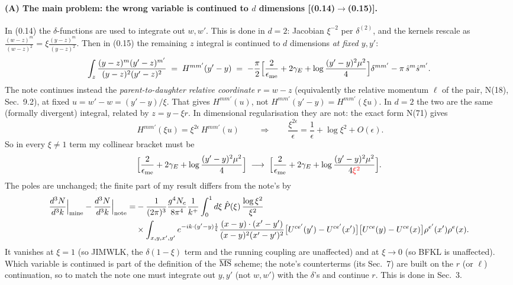 \documentclass[10pt]{article}
\numberwithin{equation}{section}
\newcommand{\Wop}[2]{\big[U^{ce'}(#2)-U^{ce'}(x')\big]\big[U^{ce}(#1)-U^{ce}(x)\big]\rho^{e'}(x')\rho^{e}(x)}
\newcommand{\Kx}[2]{\frac{(x-#1)\cdot(x'-#2)}{(x-#1)^{2}(x'-#2)^{2}}}
\newcommand{\Ph}{\hat P}
\newcommand{\red}[1]{{\color{red}#1}}
\begin{document}
\paragraph{(A) The main problem: the wrong variable is continued to $d$ dimensions [(0.14)$\to$(0.15)].}
In (0.14) the $\delta$-functions are used to integrate out $w,w'$. This is done in $d=2$: Jacobian $\xi^{-2}$ per
$\delta^{(2)}$, and the kernels rescale as $\frac{(w-z)^m}{(w-z)^2}=\xi\frac{(y-z)^m}{(y-z)^2}$. Then in (0.15) the
remaining $z$ integral is continued to $d$ dimensions \emph{at fixed $y,y'$}:
\begin{equation}
\int_z\frac{(y-z)^m(y'-z)^{m'}}{(y-z)^2(y'-z)^2}\;=\;H^{mm'}(y'-y)\;=\;-\frac{\pi}{2}\Big[\frac{2}{\epsilon_{\rm me}}+2\gamma_E+\log\frac{(y'-y)^2\mu^2}{4}\Big]\delta^{mm'}-\pi\,\hat s^m\hat s^{m'} .
\end{equation}
The note continues instead the \emph{parent-to-daughter relative coordinate} $r=w-z$ (equivalently the relative
momentum $\ell$ of the pair, N(18), Sec.~9.2), at fixed $u=w'-w=(y'-y)/\xi$. That gives $H^{mm'}(u)$, not
$H^{mm'}(y'-y)=H^{mm'}(\xi u)$. In $d=2$ the two are the same (formally divergent) integral, related by $z=y-\xi r$.
In dimensional regularisation they are not: the exact form N(71) gives
\begin{equation}
\boxed{\;H^{mm'}(\xi u)=\xi^{2\epsilon}\,H^{mm'}(u)\;}\qquad\Longrightarrow\qquad
\frac{\xi^{2\epsilon}}{\epsilon}=\frac1\epsilon+\log\xi^2+O(\epsilon).
\end{equation}
So in every $\xi\neq1$ term my collinear bracket must be
\begin{equation}
\Big[\frac{2}{\epsilon_{\rm me}}+2\gamma_E+\log\frac{(y'-y)^2\mu^2}{4}\Big]\;\longrightarrow\;
\Big[\frac{2}{\epsilon_{\rm me}}+2\gamma_E+\log\frac{(y'-y)^2\mu^2}{4\red{\xi^2}}\Big].
\end{equation}
The poles are unchanged; the finite part of my result differs from the note's by
\begin{align}
\frac{d^3N}{d^3k}\Big|_{\rm mine}-\frac{d^3N}{d^3k}\Big|_{\rm note}
=&-\frac{1}{(2\pi)^3}\frac{g^4N_c}{8\pi^4}\frac{1}{k^+}\int_0^1d\xi\,\Ph(\xi)\,\frac{\log\xi^2}{\xi^2}\notag\\
&\times\int_{x,y,x',y'}e^{-ik\cdot(y'-y)\frac1\xi}\Kx{y}{y'}\Wop{y}{y'}.
\end{align}
It vanishes at $\xi=1$ (so JIMWLK, the $\delta(1-\xi)$ term and the running coupling are unaffected) and at
$\xi\to0$ (so BFKL is unaffected). Which variable is continued is part of the definition of the $\overline{\rm MS}$
scheme; the note's counterterms (its Sec.~7) are built on the $r$ (or $\ell$) continuation, so to match the note
one must integrate out $y,y'$ (not $w,w'$) with the $\delta$'s and continue $r$. This is done in Sec.~3.
\end{document}
